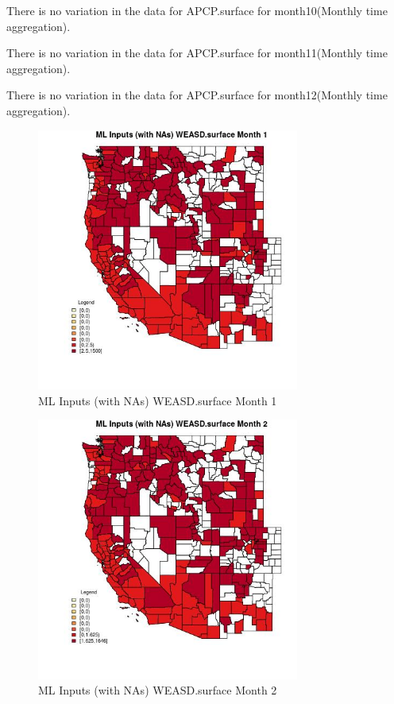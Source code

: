 There is no variation in the data for APCP.surface for month10(Monthly time aggregation). 
 

There is no variation in the data for APCP.surface for month11(Monthly time aggregation). 
 

There is no variation in the data for APCP.surface for month12(Monthly time aggregation). 
 

\begin{figure} 
\centering  
\includegraphics[width=0.77\textwidth]{Code_Outputs/Report_ML_input_PM25_Step4_part_f_de_duplicated_aveswNAs_CountyWEASDsurfacemedianMonth1.jpg} 
\caption{\label{fig:Report_ML_input_PM25_Step4_part_f_de_duplicated_aveswNAsCountyWEASDsurfacemedianMonth1}ML Inputs (with NAs) WEASD.surface Month 1} 
\end{figure} 
 

\begin{figure} 
\centering  
\includegraphics[width=0.77\textwidth]{Code_Outputs/Report_ML_input_PM25_Step4_part_f_de_duplicated_aveswNAs_CountyWEASDsurfacemedianMonth2.jpg} 
\caption{\label{fig:Report_ML_input_PM25_Step4_part_f_de_duplicated_aveswNAsCountyWEASDsurfacemedianMonth2}ML Inputs (with NAs) WEASD.surface Month 2} 
\end{figure} 
 


